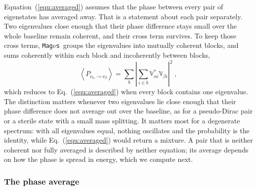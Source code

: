 \documentclass[final,5p,times,twocolumn,sort,compress]{elsarticle}
\makeatletter
\newcommand{\eq}{Eq.}
\DeclareRobustCommand{\_}{%
  \ifmmode\nfss@text{\textunderscore}\else\textunderscore\allowbreak\fi}
\newcommand{\equ}[1]{\eq~(\ref{equ:#1})}
\newcommand{\magnus}{{\tt Mag}\ensuremath{\nu}{\tt s}}
\makeatother
\begin{document}
Equation~(\ref{equ:averaged}) assumes that the phase between every pair of eigenstates has averaged away. That is a statement about each pair separately. Two eigenvalues close enough that their phase difference stays small over the whole baseline remain coherent, and their cross term survives. To keep those cross terms, \magnus\ groups the eigenvalues into mutually coherent blocks, and sums coherently within each block and incoherently between blocks,
\begin{equation}
 \label{equ:averaged_blocks}
 \left\langle P_{\nu_\alpha \to \nu_\beta} \right\rangle
 =
 \sum_b \left\vert \sum_{i \in b} \mathbb{V}^\ast_{\alpha i}\mathbb{V}_{\beta i} \right\vert^2 \;,
\end{equation}
which reduces to \equ{averaged} when every block contains one eigenvalue. The distinction matters whenever two eigenvalues lie close enough that their phase difference does not average out over the baseline, as for a pseudo-Dirac pair or a sterile state with a small mass splitting. It matters most for a degenerate spectrum: with all eigenvalues equal, nothing oscillates and the probability is the identity, while \equ{averaged} would return a mixture. A pair that is neither coherent nor fully averaged is described by neither equation; its average depends on how the phase is spread in energy, which we compute next.


\subsubsection{The phase average}
\end{document}
